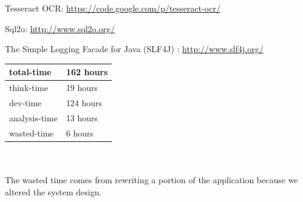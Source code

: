 \documentclass[a4paper]{IEEEtran}
\begin{document}
\begin{thebibliography}{9}

 

 {
	Tesseract OCR: \url{https://code.google.com/p/tesseract-ocr/}
}

 {
	Sql2o: \url{http://www.sql2o.org/}
}

 {
	The Simple Logging Facade for Java (SLF4J) : \url{http://www.slf4j.org/}
}

\end{thebibliography}


\begin{tabular}{| l | l |}
\hline
total-time & 162 hours \\ \hline
think-time & 19 hours \\ \hline
dev-time & 124 hours \\ \hline
analysis-time & 13 hours \\ \hline
wasted-time & 6 hours \\ \hline
\end{tabular}
\\\ 
\\
The wasted time comes from rewriting a portion of the application because we altered the system design.
\end{document}
